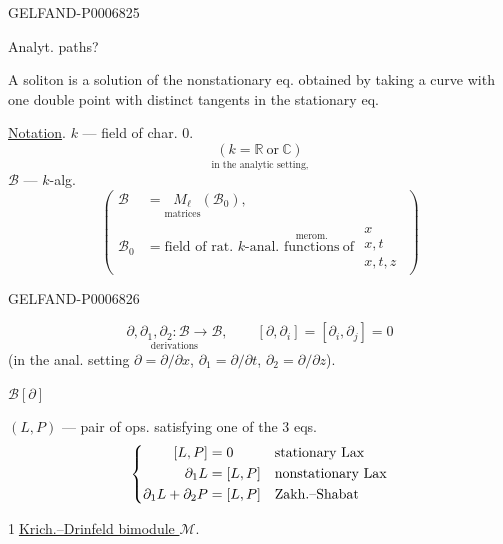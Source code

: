\begin{GelfandAdjacentEvidence}{GELFAND-P000682}{5}

Analyt. paths?

A soliton is a solution of the nonstationary eq. obtained by taking a curve with one double point with distinct tangents in the stationary eq.

\underline{Notation}. \(k\) --- field of char. 0.
\[
\underset{\text{in the analytic setting,}}{(k=\mathbb R\ \text{or}\ \mathbb C)}
\]
\(\mathcal B\) --- \(k\)-alg.
\[
\left(\begin{aligned}
\mathcal B&=\underset{\text{matrices}}{M_\ell}(\mathcal B_0),\\
\mathcal B_0&=\text{field of rat. }k\text{-anal. }
          \overset{\text{merom.}}{\text{functions}}\ \text{of }
          \begin{matrix}x\\x,t\\x,t,z\end{matrix}
\end{aligned}\right)
\]
\end{GelfandAdjacentEvidence}
\begin{GelfandAdjacentEvidence}{GELFAND-P000682}{6}


\[
\underset{\text{derivations}}{\partial,\partial_1,\partial_2:\mathcal B\longrightarrow\mathcal B},
\qquad [\partial,\partial_i]=[\partial_i,\partial_j]=0
\]
(in the anal. setting \(\partial=\partial/\partial x\), \(\partial_1=\partial/\partial t\),
\(\partial_2=\partial/\partial z\)).

\(\mathcal B[\partial]\)

\((L,P)\) --- pair of ops. satisfying one of the 3 eqs.
\[
\left\{\begin{aligned}
\relax[L,P]&=0 &&\text{stationary Lax}\\
\partial_1 L&=[L,P] &&\text{nonstationary Lax}\\
\partial_1 L+\partial_2 P&=[L,P] &&\text{Zakh.–Shabat}
\end{aligned}\right.
\]

\textcircled{1}\enspace \underline{Krich.–Drinfeld bimodule \(\mathcal M\)}.
\end{GelfandAdjacentEvidence}
